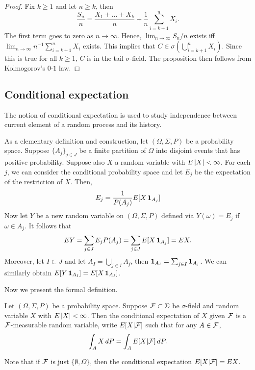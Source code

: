 \documentclass[a4paper]{article}
\begin{document}
\begin{proof}
  Fix $k \geq 1$ and let $n \geq k$, then
  \[
    \frac{S_n}{n}
    = \frac{X_1 + \dots + X_k}{n} + \frac{1}{n} \sum_{i = k + 1}^n X_i.
  \]
  The first term goes to zero as $n \to \infty$.
  Hence, $\lim_{n \to \infty} S_n / n$ exists
  iff $\lim_{n \to \infty} n^{-1} \sum_{i = k + 1}^n X_i$ exists.
  This implies that $C \in \sigma (\bigcup_{i = k + 1}^n X_i)$.
  Since this is true for all $k \geq 1$, $C$ is in the tail
  $\sigma$-field. The proposition then follows from Kolmogorov's
  $0$-$1$ law.

\end{proof}

\subsection{Conditional expectation}

The notion of conditional expectation is used to study independence
between current element of a random process and its history.

As a elementary definition and construction,
let $(\Omega, \Sigma, P)$ be a probability space.
Suppose $\{ A_j \}_{j \in J}$ be a finite partition of $\Omega$
into disjoint events that has positive probability.
Suppose also $X$ a random variable with $E \left\lvert X\right\rvert <
  \infty$. For each $j$, we can consider the conditional probability
space and let $E_j$ be the expectation of the restriction of $X$.
Then,
\[
  E_j = \frac{1}{P (A_j)} E [X \operatorname{\mathbf{1}}_{A_j}]
\]
Now let $Y$ be a new random variable on $(\Omega, \Sigma, P)$ defined
via $Y (\omega) = E_j$ if $\omega \in A_j$. It follows that
\[
  E Y
  = \sum_{j \in J} E_j P(A_j)
  = \sum_{j \in J} E [X \operatorname{\mathbf{1}}_{A_j}]
  = E X.
\]
Moreover, let $I \subset J$ and let $A_I = \bigcup_{j \in I} A_j$,
then $\operatorname{\mathbf{1}}_{A_I} = \sum_{j \in I} \operatorname{\mathbf{1}}_{A_j}$.
We can similarly obtain $E [Y \operatorname{\mathbf{1}}_{A_I}] = E [X \operatorname{\mathbf{1}}_{A_I}]$.

Now we present the formal definition.
\begin{defi}
  Let $(\Omega, \Sigma, P)$ be a probability space.
  Suppose $\mathcal{F} \subset \Sigma$ be $\sigma$-field and random
  variable $X$ with $E \left\lvert X\right\rvert < \infty$.
  Then the conditional expectation of $X$ given $\mathcal{F}$
  is a $\mathcal{F}$-measurable random variable, write $E [X | \mathcal{F}]$
  such that for any $A \in \mathcal{F}$,
  \[
    \int_A X \, d P = \int_A E [X | \mathcal{F}] \, d P.
  \]
\end{defi}

\begin{remark}
  Note that if $\mathcal{F}$ is just $\{ \emptyset, \Omega \}$, then
  the conditional expectation $E [X | \mathcal{F}] = E X$.
\end{remark}
\end{document}
